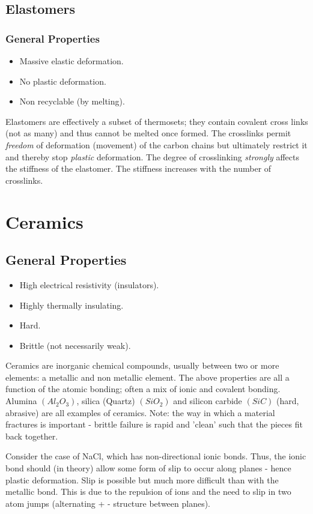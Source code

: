 \subsection{Elastomers}
\subsubsection{General Properties}
\begin{itemize}[noitemsep]
  \item Massive elastic deformation.
  \item No plastic deformation.
  \item Non recyclable (by melting).
\end{itemize}
Elastomers are effectively a subset of thermosets; they contain covalent cross links (not as many) and thus cannot be melted once formed. The crosslinks permit \emph{freedom} of deformation (movement) of the carbon chains but ultimately restrict it and thereby stop \emph{plastic} deformation. The degree of crosslinking \emph{strongly} affects the stiffness of the elastomer. The stiffness increases with the number of crosslinks.
\section{Ceramics}
\subsection{General Properties}
\begin{itemize}[noitemsep]
  \item High electrical resistivity (insulators).
  \item Highly thermally insulating.
  \item Hard.
  \item Brittle (not necessarily weak).
\end{itemize}
Ceramics are inorganic chemical compounds, usually between two or more elements: a metallic and non metallic element. The above properties are all a function of the atomic bonding; often a mix of ionic and covalent bonding. Alumina \((Al_2O_3)\), silica (Quartz) \((SiO_2)\) and silicon carbide \((SiC)\) (hard, abrasive) are all examples of ceramics. Note: the way in which a material fractures is important - brittle failure is rapid and 'clean' such that the pieces fit back together.

Consider the case of NaCl, which has non-directional ionic bonds. Thus, the ionic bond should (in theory) allow some form of slip to occur along planes - hence plastic deformation. Slip is possible but much more difficult than with the metallic bond. This is due to the repulsion of ions and the need to slip in two atom jumps (alternating + - structure between planes).

